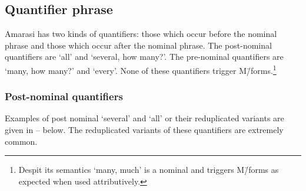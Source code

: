 \subsection{Quantifier phrase}\label{sec:QuaPhr}
Amarasi has two kinds of quantifiers: those which occur before the nominal phrase
and those which occur after the nominal phrase.
The post-nominal quantifiers are  `all' and  `several, how many?'.
The pre-nominal quantifiers are  `many, how many?' and  `every'.
None of these quantifiers trigger M\=/forms.\footnote{
		Despit its semantics  `many, much' is a nominal
		and triggers M\=/forms as expected when used attributively.}

\subsubsection{Post-nominal quantifiers}
Examples of post nominal  `several' and  `all'
or their reduplicated variants are given in
-- below.
The reduplicated variants of these quantifiers are extremely common.

\begin{exe}
	\label{ex:130920-1, 4.53-4.56}
	\label{ex:Acts 21:10}
	\label{ex:Genesis 25:24}
	\label{ex:Genesis 8:17}
\end{exe}

